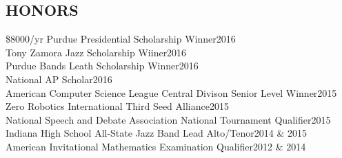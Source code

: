 \documentclass[line,margin]{res}
\begin{document}
\begin{resume}





  \section{HONORS}
  \$8000/yr Purdue Presidential Scholarship Winner\hfill 2016\\
  Tony Zamora Jazz Scholarship Wiiner\hfill 2016\\
  Purdue Bands Leath Scholarship Winner\hfill 2016\\
  National AP Scholar\hfill 2016\\
  American Computer Science League Central Divison Senior Level Winner\hfill 2015\\
  Zero Robotics International Third Seed Alliance\hfill 2015\\
  National Speech and Debate Association National Tournament Qualifier\hfill 2015\\
  Indiana High School All-State Jazz Band Lead Alto/Tenor\hfill 2014 \& 2015\\
  American Invitational Mathematics Examination Qualifier\hfill 2012 \& 2014

\end{resume}
\end{document}
